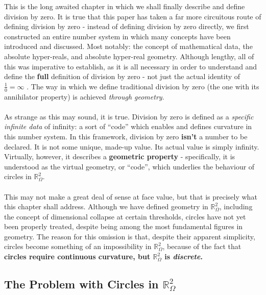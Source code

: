 \documentclass{article}
\begin{document}
This is the long awaited chapter in which we shall finally describe and define 
division by zero. It is true that this paper has taken a far more circuitous 
route of defining division by zero - instead of defining division by zero 
directly, we first constructed an entire number system in which many concepts 
have been introduced and discussed. Most notably: the concept of mathematical 
data, the absolute hyper-reals, and absolute hyper-real geometry. Although 
lengthy, all of this was imperative to establish, as it is all necessary in 
order to understand and define the \textbf{full} definition of division by 
zero - not just the actual identity of $\frac{1}{0} = \infty$ . The way in which we define traditional division by zero (the 
one with its annihilator property) is achieved \textit{through geometry}.\\\\
As strange as this may sound, it is true. Division by zero is defined as a 
\textit{specific infinite data} of infinity: a sort of ``code'' which enables 
and defines curvature in this number system. In this framework, division by 
zero \textbf{isn't} a number to be declared. It is not some unique, made-up 
value. Its actual value is simply infinity. Virtually, however, it describes a 
\textbf{geometric property} - specifically, it is understood as the virtual 
geometry, or ``code'', which underlies the behaviour of circles in 
$\mathbb{R}_\Omega^2$.\\\\
This may not make a great deal of sense at face value, but that is precisely 
what this chapter shall address. Although we have defined geometry in 
$\mathbb{R}_\Omega^2$, including the concept of dimensional collapse at certain 
thresholds, circles have not yet been properly treated, despite being among the 
most fundamental figures in geometry. The reason for this omission is that, 
despite their apparent simplicity, circles become something of an impossibility 
in $\mathbb{R}_\Omega^2$, because of the fact that \textbf{circles require continuous curvature, but 
$\mathbb{R}_\Omega^2$ is \textit{discrete}.}


\subsection{The Problem with Circles in $\mathbb{R}_\Omega^2$}
\end{document}
